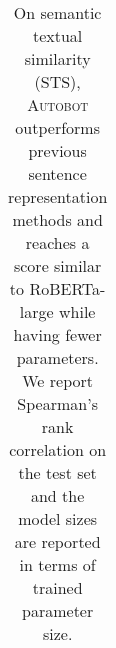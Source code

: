 \begin{table}[t]
\begin{tabular}{l | c | c}
    \bottomrule
	\end{tabular}
	\caption{ \label{tab:nli_sts}On semantic textual similarity (STS), \textsc{Autobot} outperforms previous sentence representation methods and reaches a score similar to RoBERTa-large while having fewer parameters.   %
	We report Spearman's rank correlation on the test set and the model sizes are reported in terms of trained parameter size.}

	
	
\end{table}



